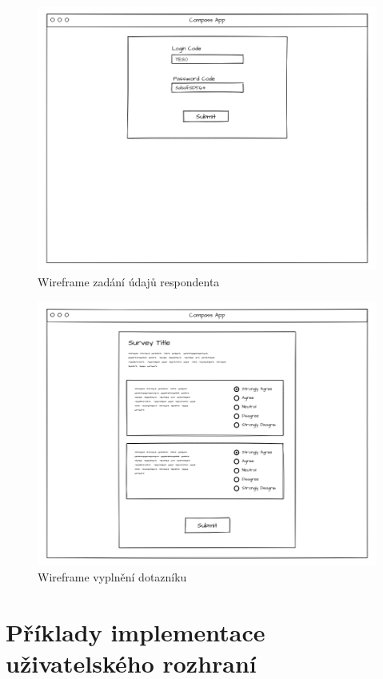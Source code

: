 \begin{figure}[h!]
    \centering
    \includegraphics[width=\textwidth]{images/wireframes/Fill_Survey_Login.png}
    \caption{Wireframe zadání údajů respondenta}
\end{figure}

\begin{figure}[h!]
    \centering
    \includegraphics[width=\textwidth]{images/wireframes/Fill_Survey_Fill.png}
    \caption{Wireframe vyplnění dotazníku}
\end{figure}


\chapter{Příklady implementace uživatelského rozhraní}

